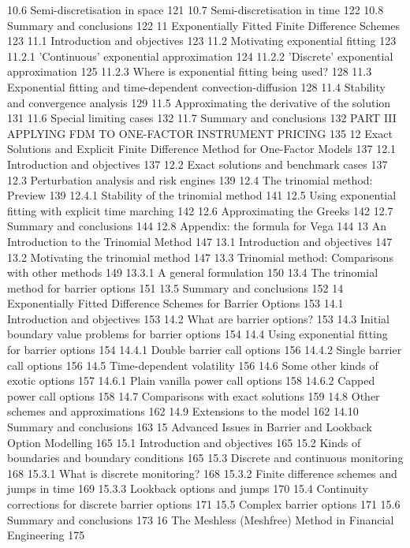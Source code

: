 10.6 Semi-discretisation in space 121
10.7 Semi-discretisation in time 122
10.8 Summary and conclusions 122
11 Exponentially Fitted Finite Difference Schemes 123
11.1 Introduction and objectives 123
11.2 Motivating exponential fitting 123
11.2.1 'Continuous' exponential approximation 124
11.2.2 'Discrete' exponential approximation 125
11.2.3 Where is exponential fitting being used? 128
11.3 Exponential fitting and time-dependent convection-diffusion 128
11.4 Stability and convergence analysis 129
11.5 Approximating the derivative of the solution 131
11.6 Special limiting cases 132
11.7 Summary and conclusions 132
PART III APPLYING FDM TO ONE-FACTOR INSTRUMENT PRICING 135
12 Exact Solutions and Explicit Finite Difference Method
for One-Factor Models 137
12.1 Introduction and objectives 137
12.2 Exact solutions and benchmark cases 137
12.3 Perturbation analysis and risk engines 139
12.4 The trinomial method: Preview 139
12.4.1 Stability of the trinomial method 141
12.5 Using exponential fitting with explicit time marching 142
12.6 Approximating the Greeks 142
12.7 Summary and conclusions 144
12.8 Appendix: the formula for Vega 144
13 An Introduction to the Trinomial Method 147
13.1 Introduction and objectives 147
13.2 Motivating the trinomial method 147
13.3 Trinomial method: Comparisons with other methods 149
13.3.1 A general formulation 150
13.4 The trinomial method for barrier options 151
13.5 Summary and conclusions 152
14 Exponentially Fitted Difference Schemes for Barrier Options 153
14.1 Introduction and objectives 153
14.2 What are barrier options? 153
14.3 Initial boundary value problems for barrier options 154
14.4 Using exponential fitting for barrier options 154
14.4.1 Double barrier call options 156
14.4.2 Single barrier call options 156
14.5 Time-dependent volatility 156
14.6 Some other kinds of exotic options 157
14.6.1 Plain vanilla power call options 158
14.6.2 Capped power call options 158
14.7 Comparisons with exact solutions 159
14.8 Other schemes and approximations 162
14.9 Extensions to the model 162
14.10 Summary and conclusions 163
15 Advanced Issues in Barrier and Lookback Option Modelling 165
15.1 Introduction and objectives 165
15.2 Kinds of boundaries and boundary conditions 165
15.3 Discrete and continuous monitoring 168
15.3.1 What is discrete monitoring? 168
15.3.2 Finite difference schemes and jumps in time 169
15.3.3 Lookback options and jumps 170
15.4 Continuity corrections for discrete barrier options 171
15.5 Complex barrier options 171
15.6 Summary and conclusions 173
16 The Meshless (Meshfree) Method in Financial Engineering 175

